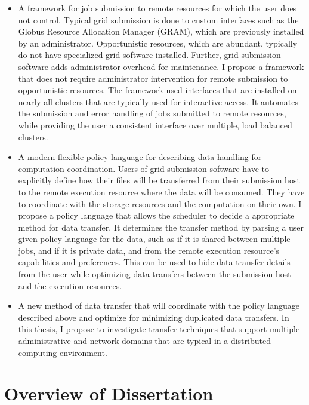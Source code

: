 \begin{itemize}

\item A framework for job submission to remote resources for which the user does not control.  Typical grid submission is done to custom interfaces such as the Globus Resource Allocation Manager \cite{foster1999globus} (GRAM), which are previously installed by an administrator.  Opportunistic resources, which are abundant, typically do not have specialized grid software installed.  Further, grid submission software adds administrator overhead for maintenance.  I propose a framework that does not require administrator intervention for remote submission to opportunistic resources.  The framework used interfaces that are installed on nearly all clusters that are typically used for interactive access.  It automates the submission and error handling of jobs submitted to remote resources, while providing the user a consistent interface over multiple, load balanced clusters.

\item A modern flexible policy language for describing data handling for computation coordination.  Users of grid submission software have to explicitly define how their files will be transferred from their submission host to the remote execution resource where the data will be consumed.  They have to coordinate with the storage resources and the computation on their own.  I propose a policy language that allows the scheduler to decide a appropriate method for data transfer.  It determines the transfer method by parsing a user given policy language for the data, such as if it is shared between multiple jobs, and if it is private data, and from the remote execution resource's capabilities and preferences.  This can be used to hide data transfer details from the user while optimizing data transfers between the submission host and the execution resources.

\item A new method of data transfer that will coordinate with the policy language described above and optimize for minimizing duplicated data transfers.  In this thesis, I propose to investigate transfer techniques that support multiple administrative and network domains that are typical in a distributed computing environment.

\end{itemize}

\section{Overview of Dissertation}


